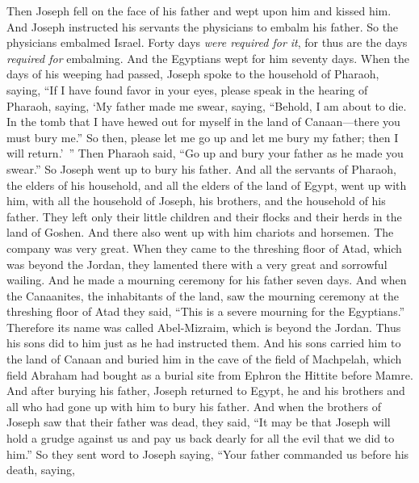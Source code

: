 \begin{biblechapter} %
 Then Joseph fell on the face of his father and wept upon him and kissed him.
\verse And Joseph instructed his servants the physicians to embalm his father. So the physicians embalmed Israel.
\verse Forty days \textit{were required for it}, for thus are the days \textit{required for} embalming. And the Egyptians wept for him seventy days.
\verse When the days of his weeping had passed, Joseph spoke to the household of Pharaoh, saying, “If I have found favor in your eyes, please speak in the hearing of Pharaoh, saying,
\verse ‘My father made me swear, saying, “Behold, I am about to die. In the tomb that I have hewed out for myself in the land of Canaan—there you must bury me.” So then, please let me go up and let me bury my father; then I will return.’ ”
\verse Then Pharaoh said, “Go up and bury your father as he made you swear.”
\verse So Joseph went up to bury his father. And all the servants of Pharaoh, the elders of his household, and all the elders of the land of Egypt, went up with him,
\verse with all the household of Joseph, his brothers, and the household of his father. They left only their little children and their flocks and their herds in the land of Goshen.
\verse And there also went up with him chariots and horsemen. The company was very great.
\verse When they came to the threshing floor of Atad, which was beyond the Jordan, they lamented there with a very great and sorrowful wailing. And he made a mourning ceremony for his father seven days.
\verse And when the Canaanites, the inhabitants of the land, saw the mourning ceremony at the threshing floor of Atad they said, “This is a severe mourning for the Egyptians.” Therefore its name was called Abel-Mizraim, which is beyond the Jordan.
\verse Thus his sons did to him just as he had instructed them.
\verse And his sons carried him to the land of Canaan and buried him in the cave of the field of Machpelah, which field Abraham had bought as a burial site from Ephron the Hittite before Mamre.
\verse And after burying his father, Joseph returned to Egypt, he and his brothers and all who had gone up with him to bury his father.
\verse And when the brothers of Joseph saw that their father was dead, they said, “It may be that Joseph will hold a grudge against us and pay us back dearly for all the evil that we did to him.”
\verse So they sent word to Joseph saying, “Your father commanded us before his death, saying,

\end{biblechapter}
